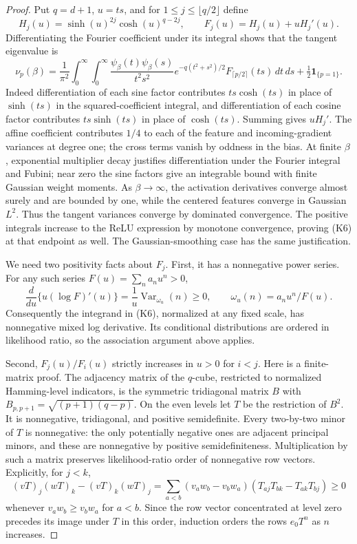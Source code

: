 \documentclass[11pt]{article}
\newcommand{\one}{\mathbf1}
\begin{document}
\begin{proof}
Put $q=d+1$, $u=ts$, and for $1\le j\le\lfloor q/2\rfloor$ define
\[
 H_j(u)=\sinh(u)^{2j}\cosh(u)^{q-2j},\qquad
 F_j(u)=H_j(u)+uH_j'(u).
\]
Differentiating the Fourier coefficient under its integral shows that
the tangent eigenvalue is
\[
 \nu_p(\beta)=\frac1{\pi^2}\int_0^\infty\!\int_0^\infty
 \frac{\psi_\beta(t)\psi_\beta(s)}{t^2s^2}
 e^{-q(t^2+s^2)/2}F_{\lceil p/2\rceil}(ts)\,dt\,ds
                +\tfrac12\one_{\{p=1\}}.              \tag{K6}
\]
Indeed differentiation of each sine factor contributes $ts\cosh(ts)$
in place of $\sinh(ts)$ in the squared-coefficient integral, and
differentiation of each cosine factor contributes $ts\sinh(ts)$
in place of $\cosh(ts)$. Summing gives $uH_j'$.
The affine coefficient contributes $1/4$ to each of the feature and
incoming-gradient variances at degree one; the cross terms vanish
by oddness in the bias. At finite $\beta$, exponential multiplier decay
justifies differentiation under the Fourier integral and Fubini; near
zero the sine factors give an integrable bound with finite Gaussian
weight moments. As $\beta\to\infty$, the activation derivatives
converge almost surely and are bounded by one, while the centered
features converge in Gaussian $L^2$. Thus the tangent variances converge
by dominated convergence. The positive integrals increase to the
ReLU expression by monotone convergence, proving (K6) at that endpoint
as well. The Gaussian-smoothing case has the same justification.

We need two positivity facts about $F_j$. First, it has a nonnegative
power series. For any such series $F(u)=\sum_n a_nu^n>0$,
\[
 \frac{d}{du}\{u(\log F)'(u)\}
     =\frac1u\operatorname{Var}_{\omega_u}(n)\ge0,
 \qquad \omega_u(n)=a_nu^n/F(u).                       \tag{K7}
\]
Consequently the integrand in (K6), normalized at any fixed scale,
has nonnegative mixed log derivative. Its conditional distributions
are ordered in likelihood ratio, so the association argument above applies.

Second, $F_j(u)/F_i(u)$ strictly increases in $u>0$ for $i<j$.
Here is a finite-matrix proof. The adjacency matrix of the $q$-cube,
restricted to normalized Hamming-level indicators, is the symmetric
tridiagonal matrix $B$ with
$B_{p,p+1}=\sqrt{(p+1)(q-p)}$. On the even levels let $T$ be the
restriction of $B^2$. It is nonnegative, tridiagonal, and positive
semidefinite. Every two-by-two minor of $T$ is nonnegative:
the only potentially negative ones are adjacent principal minors,
and these are nonnegative by positive semidefiniteness.
Multiplication by such a matrix preserves likelihood-ratio order
of nonnegative row vectors. Explicitly, for $j<k$,
\[
 (vT)_j(wT)_k-(vT)_k(wT)_j
 =\sum_{a<b}(v_aw_b-v_bw_a)
                      (T_{aj}T_{bk}-T_{ak}T_{bj})\ge0
\]
whenever $v_aw_b\ge v_bw_a$ for $a<b$.
Since the row vector concentrated at level zero precedes its image
under $T$ in this order, induction orders the rows $e_0T^n$ as $n$
increases.


\end{proof}
\end{document}
